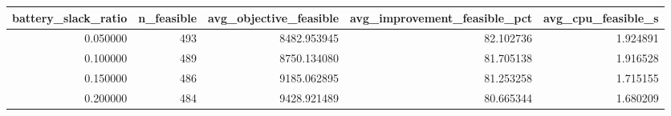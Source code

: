 \begin{tabular}{rrrrr}
\toprule
battery_slack_ratio & n_feasible & avg_objective_feasible & avg_improvement_feasible_pct & avg_cpu_feasible_s \\
\midrule
0.050000 & 493 & 8482.953945 & 82.102736 & 1.924891 \\
0.100000 & 489 & 8750.134080 & 81.705138 & 1.916528 \\
0.150000 & 486 & 9185.062895 & 81.253258 & 1.715155 \\
0.200000 & 484 & 9428.921489 & 80.665344 & 1.680209 \\
\bottomrule
\end{tabular}
